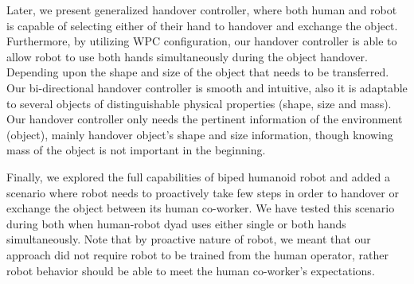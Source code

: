 Later, we present generalized handover controller, where both human and robot is capable of selecting either of their hand to handover and exchange the object. Furthermore, by utilizing WPC configuration, our handover controller is able to allow robot to use both hands simultaneously during the object handover. Depending upon the shape and size of the object that needs to be transferred. Our bi-directional handover controller is smooth and intuitive, also it is adaptable to several objects of distinguishable physical properties (shape, size and mass). Our handover controller only needs the pertinent information of the environment (object), mainly handover object's shape and size information, though knowing mass of the object is not important in the beginning.

Finally, we explored the full capabilities of biped humanoid robot and added a scenario where robot needs to proactively take few steps in order to handover or exchange the object between its human co-worker. We have tested this scenario during both when human-robot dyad uses either single or both hands simultaneously. Note that by proactive nature of robot, we meant that our approach did not require robot to be trained from the human operator, rather robot behavior should be able to meet the human co-worker's expectations.


\clearpage %



%



%
